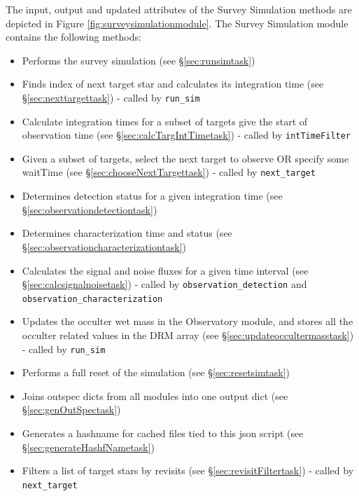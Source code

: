 \documentclass[cleanfoot]{asme2ej}
\newcommand{\reffig}[1]{Figure \ref{#1}}
\begin{document}
The input, output and updated attributes of the Survey Simulation methods are depicted in \reffig{fig:surveysimulationmodule}. The Survey Simulation module contains the following methods:
\begin{itemize}[leftmargin=2.5in,font={\ttfamily}]
    \item[\texttt run\_sim] Performs the survey simulation (see \S\ref{sec:runsimtask})
    \item[\texttt next\_target] Finds index of next target star and calculates its integration time (see \S\ref{sec:nexttargettask}) - called by \verb+run_sim+
    \item[\texttt calc\_targ\_intTime] Calculate integration times for a subset of targets give the start of observation time (see \S\ref{sec:calcTargIntTimetask}) - called by \verb+intTimeFilter+
    \item[\texttt choose\_next\_target] Given a subset of targets, select the next target to observe OR specify some waitTime (see \S\ref{sec:chooseNextTargettask}) - called by \verb+next_target+
    \item[\texttt observation\_detection] Determines detection status for a given integration time  (see \S\ref{sec:observationdetectiontask})
    \item[\texttt observation\_characterization] Determines characterization time and status (see \S\ref{sec:observationcharacterizationtask})
    \item[\texttt calc\_signal\_noise] Calculates the signal and noise fluxes for a given time interval (see \S\ref{sec:calcsignalnoisetask}) - called by \verb+observation_detection+ and \verb+observation_characterization+
    \item[\texttt update\_occulter\_mass] Updates the occulter wet mass in the Observatory module, and stores all the occulter related values in the DRM array (see \S\ref{sec:updateoccultermasstask}) - called by \verb+run_sim+
    \item[\texttt reset\_sim] Performs a full reset of the simulation (see \S\ref{sec:resetsimtask})
    \item[\texttt genOutSpec] Joins outspec dicts from all modules into one output dict (see \S\ref{sec:genOutSpectask})
    \item[\texttt generateHashName] Generates a hashname for cached files tied to this json script (see \S\ref{sec:generateHashfNametask})
    \item[\texttt revisitFilter] Filters a list of target stars by revisits (see \S\ref{sec:revisitFiltertask}) - called by \verb+next_target+
\end{itemize}
\end{document}
